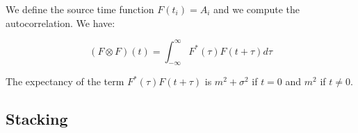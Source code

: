 \documentclass[workdone.tex]{subfiles}
\begin{document}
We define the source time function $F (t_i) = A_i$ and we compute the autocorrelation. We have:

\begin{equation}
(F \otimes F) (t) = \int_{- \infty}^{\infty} F^* (\tau) F (t + \tau) d\tau
\end{equation}

The expectancy of the term $F^* (\tau) F (t + \tau)$ is $m^2 + \sigma^2$ if $t = 0$ and $m^2$ if $t \neq 0$.

\subsection{Stacking}
\end{document}
